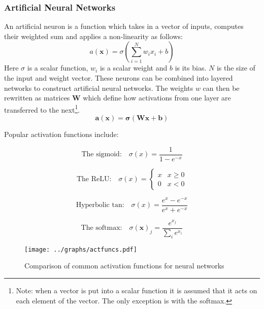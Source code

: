 \documentclass[9pt]{article} \usepackage{amsmath, amsthm, amssymb}
\begin{document}
\subsubsection{Artificial Neural Networks}
An artificial neuron is a function which takes in a vector of inputs, computes their
weighted sum and applies a non-linearity as follows:
\begin{equation}
    a(\mathbf{x}) = \sigma \left ( \sum_{i=1}^N w_ix_i + b \right )
\end{equation}
Here $\sigma$ is a scalar function, $w_i$ is a scalar weight and $b$ is its bias. $N$ is the size of the input and weight vector.
These neurons can be combined into layered networks to construct artificial neural networks.
The weights $w$ can then be rewritten as matrices $\mathbf{W}$ which define how
activations from one layer are transferred to the next\footnote{Note: when a vector
is put into a scalar function it is assumed that it acts on each element of
the vector. The only exception is with the softmax.}.
\begin{equation}
    \mathbf{a}(\mathbf{x}) = \mathbf{\sigma} \left ( \mathbf{W}\mathbf{x} + \mathbf{b} \right )
\end{equation}

Popular activation functions include:
\begin{multicols}{2}


\begin{equation}
\text{The sigmoid:}\quad
  \sigma (x) = \frac{1}{1-e^{-x}}
\end{equation}


\begin{equation}
\text{The ReLU:}\quad
\sigma(x) =
\begin{cases}
      x & x\geq 0 \\
      0 & x < 0
   \end{cases}
\end{equation}


\begin{equation}
\text{Hyperbolic tan:}\quad
    \sigma(x)=\frac{e^x - e^{-x}}{e^x + e^{-x}}
\end{equation}


\begin{equation}
\text{The softmax:}\quad
  \sigma(\mathbf{x})_j = \frac{e^{x_j}}{\sum_i e^{x_i}}
\end{equation}


\end{multicols}

\begin{figure} \label{disfagraph}
    \center
  \texttt{[image: ../graphs/actfuncs.pdf]}
  \caption{Comparison of common activation functions for neural networks}
\end{figure}
\end{document}
